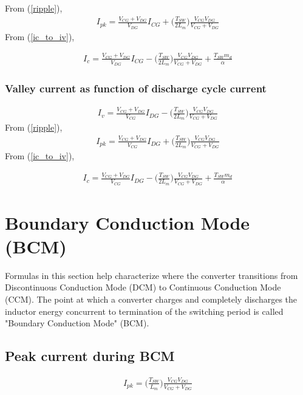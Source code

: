 \documentclass{scrartcl}
\begin{document}
			From (\ref{ripple}),
			\begin{align}
			I_{pk} = \frac{V_{CG} + V_{DG}}{V_{DG}} I_{CG} + \bigg(\frac{T_{SW}}{2L_m}\bigg)\frac{V_{CG}V_{DG}}{V_{CG} + V_{DG}} 
			\end{align}	
			From (\ref{ic_to_iv}),

			\begin{align}
			I_{c} = \frac{V_{CG} + V_{DG}}{V_{DG}} I_{CG} - \bigg(\frac{T_{SW}}{2L_m}\bigg)\frac{V_{CG}V_{DG}}{V_{CG} + V_{DG}} + \frac{T_{SW}m_d} {\alpha}
			\end{align}				
				
			\subsubsection{Valley current as function of discharge cycle current}
			\begin{align}
			I_{v} = \frac{V_{CG} + V_{DG}}{V_{CG}} I_{DG} - \bigg(\frac{T_{SW}}{2L_m}\bigg)\frac{V_{CG}V_{DG}}{V_{CG} + V_{DG}} 
			\end{align}				
			From (\ref{ripple}),
			\begin{align}
			I_{pk} = \frac{V_{CG} + V_{DG}}{V_{CG}} I_{DG} + \bigg(\frac{T_{SW}}{2L_m}\bigg)\frac{V_{CG}V_{DG}}{V_{CG} + V_{DG}} 
			\end{align}	
			From (\ref{ic_to_iv}),
			
			\begin{align}
			I_{c} = \frac{V_{CG} + V_{DG}}{V_{CG}} I_{DG} - \bigg(\frac{T_{SW}}{2L_m}\bigg)\frac{V_{CG}V_{DG}}{V_{CG} + V_{DG}} + \frac{T_{SW}m_d} {\alpha}
			\end{align}	

	\section{Boundary Conduction Mode (BCM)}
	Formulas in this section help characterize where the converter transitions from Discontinuous Conduction Mode (DCM) to Continuous Conduction Mode (CCM). The point at which a converter charges and completely discharges the inductor energy concurrent to termination of the switching period is called "Boundary Conduction Mode" (BCM).
		\subsection{Peak current during BCM}
		
			\begin{align}
			I_{pk} = \bigg(\frac{T_{SW}}{L_m}\bigg)\frac{V_{CG}V_{DG}}{V_{CG} + V_{DG}} 
			\end{align}	
			
\end{document}
